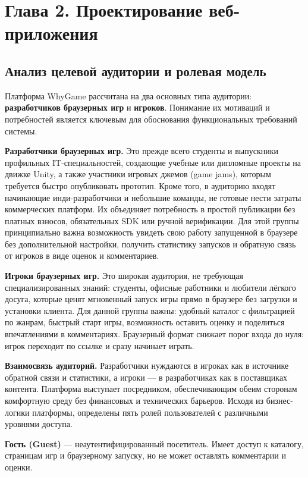 \section*{Глава 2. Проектирование веб-приложения}

\subsection{Анализ целевой аудитории и ролевая модель}

Платформа WhyGame рассчитана на два основных типа аудитории: \textbf{разработчиков
браузерных игр} и \textbf{игроков}. Понимание их мотиваций и потребностей является
ключевым для обоснования функциональных требований системы.

\textbf{Разработчики браузерных игр.} Это прежде всего студенты и выпускники
профильных IT-специальностей, создающие учебные или дипломные проекты на движке
Unity, а также участники игровых джемов (game jams), которым требуется быстро
опубликовать прототип. Кроме того, в аудиторию входят начинающие инди-разработчики
и небольшие команды, не готовые нести затраты коммерческих платформ. Их объединяет
потребность в простой публикации без платных взносов, обязательных SDK или ручной
верификации. Для этой группы принципиально важна возможность увидеть свою работу
запущенной в браузере без дополнительной настройки, получить статистику запусков
и обратную связь от игроков в виде оценок и комментариев.

\textbf{Игроки браузерных игр.} Это широкая аудитория, не требующая
специализированных знаний: студенты, офисные работники и любители лёгкого досуга,
которые ценят мгновенный запуск игры прямо в браузере без загрузки и установки
клиента. Для данной группы важны: удобный каталог с фильтрацией по жанрам, быстрый
старт игры, возможность оставить оценку и поделиться впечатлениями в комментариях.
Браузерный формат снижает порог входа до нуля: игрок переходит по ссылке и сразу
начинает играть.

\textbf{Взаимосвязь аудиторий.} Разработчики нуждаются в игроках как в источнике
обратной связи и статистики, а игроки --- в разработчиках как в поставщиках
контента. Платформа выступает посредником, обеспечивающим обеим сторонам комфортную
среду без финансовых и технических барьеров. Исходя из бизнес-логики платформы,
определены пять ролей пользователей с различными уровнями доступа.

\textbf{Гость (Guest)} --- неаутентифицированный посетитель. Имеет доступ к
каталогу, страницам игр и браузерному запуску, но не может оставлять комментарии
и оценки.

